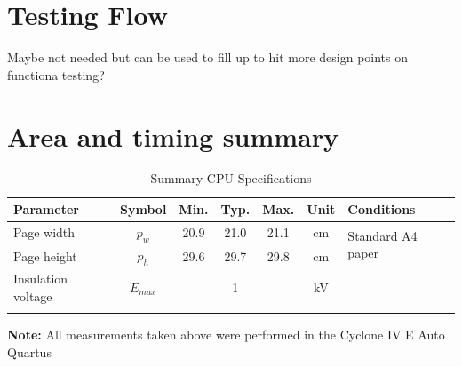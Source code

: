 \documentclass[10pt]{datasheet}
\begin{document}
\section{Testing Flow}
Maybe not needed but can be used to fill up to hit more design points on functiona testing?
\smallbreak



\onecolumn

\section{Area and timing summary}
\smallbreak

\begin{table}[h]
\caption{Summary CPU Specifications}
\begin{tabularx}{\textwidth}{l | c | c c c | c | X}
    \thickhline
    \textbf{Parameter} & \textbf{Symbol} & \textbf{Min.} & \textbf{Typ.} & \textbf{Max.} &
    \textbf{Unit} & \textbf{Conditions} \\
    \hline
    Page width  & $p_w$ & 20.9 & 21.0 & 21.1 & cm & \multirow{2}{*}{Standard A4 paper} \\
    Page height & $p_h$ & 29.6 & 29.7 & 29.8 & cm &  \\
    \hline
    Insulation voltage & $E_{max}$\footnotemark[1] & & 1 & & kV & \\
    \thickhline
\end{tabularx}
\end{table}

\textbf{Note:} All measurements taken above were performed in the Cyclone IV E Auto Quartus
\end{document}
